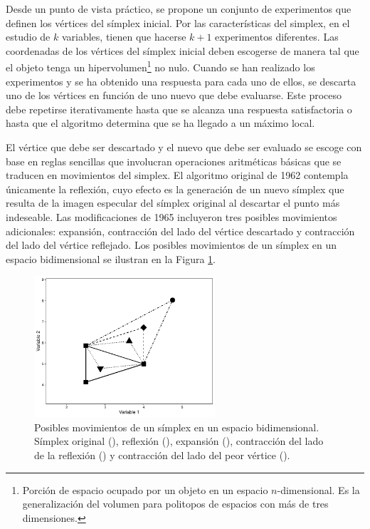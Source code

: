 Desde un punto de vista práctico, se propone un conjunto de experimentos que definen los vértices del símplex inicial. Por las características del simplex, en el estudio de $k$ variables, tienen que hacerse $k+1$ experimentos diferentes. Las coordenadas de los vértices del símplex inicial deben escogerse de manera tal que el objeto tenga un hipervolumen\footnote{Porción de espacio ocupado por un objeto en un espacio $n$-dimensional. Es la generalización del volumen para politopos de espacios con más de tres dimensiones.} no nulo. Cuando se han realizado los experimentos y se ha obtenido una respuesta para cada uno de ellos, se descarta uno de los vértices en función de uno nuevo que debe evaluarse. Este proceso debe repetirse iterativamente hasta que se alcanza una respuesta satisfactoria o hasta que el algoritmo determina que se ha llegado a un máximo local.

El vértice que debe ser descartado y el nuevo que debe ser evaluado se escoge con base en reglas sencillas que involucran operaciones aritméticas básicas que se traducen en {movimientos del simplex}. El algoritmo original de 1962 contempla únicamente la {reflexión}, cuyo efecto es la generación de un nuevo símplex que resulta de la imagen especular del símplex original al descartar el punto más indeseable. Las modificaciones de 1965 incluyeron tres posibles movimientos adicionales: {expansión}, {contracción del lado del vértice descartado} y {contracción del lado del vértice reflejado}. Los posibles movimientos de un símplex en un espacio bidimensional se ilustran en la Figura \ref{fig:Simplexmov}.

\begin{figure}[htbp]
    \centering
    \includegraphics[width=0.6\textwidth]{chap2/images/simplexmov.pdf}
    \caption[Posibles movimientos de un símplex en un espacio bidimensional.]{Posibles movimientos de un símplex en un espacio bidimensional. Símplex original (\protect\squareblck), reflexión (\protect\squarerttdblck), expansión (\protect\circleblck), contracción del lado de la reflexión (\protect\triangleupblck) y contracción del lado del peor vértice (\protect\triangledownblck).}
    \label{fig:Simplexmov}
\end{figure}

